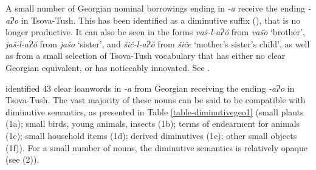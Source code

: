 A small number of Georgian nominal borrowings ending in \textit{-a} receive the ending \textit{-aɁo} in Tsova-Tush. This has been identified as a diminutive suffix (\citealt{kadagidze87ao}), that is no longer productive. It can also be seen in the forms \textit{vaš-l-aɁ\u{o}} from \textit{vašo} `brother', \textit{jaš-l-aɁ\u{o}} from \textit{jašo} `sister', and \textit{šič-l-aɁ\u{o}} from \textit{šiče} `mother's sister's child', as well as from a small selection of Tsova-Tush vocabulary that has either no clear Georgian equivalent, or has noticeably innovated. See .

\begin{table}
	\caption{Tsova-Tush nouns with the \textit{-aɁo} diminutive suffix (adapted from \citealt[213]{kadagidze87ao})}
	\label{table-diminutivett}
\end{table}

\textcite[]{kadagidze87ao} identified 43 clear loanwords in \textit{-a} from Georgian receiving the ending \textit{-aɁo} in Tsova-Tush. The vast majority of these nouns can be said to be compatible with diminutive semantics, as presented in Table \ref{table-diminutivegeo1} (small plants (1a); small birds, young animals, insects (1b); terms of endearment for animals (1c); small household items (1d); derived diminutives (1e); other small objects (1f)). For a small number of nouns, the diminutive semantics is relatively opaque (see (2)). 

